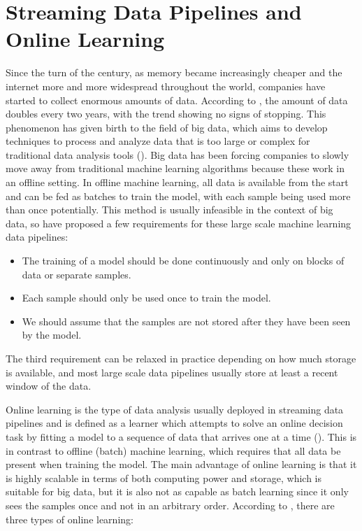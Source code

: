 \documentclass[12pt]{extreport}
\begin{document}
\section{Streaming Data Pipelines and Online Learning}

Since the turn of the century, as memory became increasingly cheaper and the internet more and more widespread throughout the world, companies have started to collect enormous amounts of data. According to \cite{big-data-beginning-future}, the amount of data doubles every two years, with the trend showing no signs of stopping. This phenomenon has given birth to the field of big data, which aims to develop techniques to process and analyze data that is too large or complex for traditional data analysis tools (\cite{wiki:big-data}). Big data has been forcing companies to slowly move away from traditional machine learning algorithms because these work in an offline setting. In offline machine learning, all data is available from the start and can be fed as batches to train the model, with each sample being used more than once potentially. This method is usually infeasible in the context of big data, so \cite{advances-knowledge-discovery} have proposed a few requirements for these large scale machine learning data pipelines:

\begin{itemize}
    \item The training of a model should be done continuously and only on blocks of data or separate samples.
    \item Each sample should only be used once to train the model.
    \item We should assume that the samples are not stored after they have been seen by the model.
\end{itemize}

The third requirement can be relaxed in practice depending on how much storage is available, and most large scale data pipelines usually store at least a recent window of the data.

Online learning is the type of data analysis usually deployed in streaming data pipelines and is defined as a learner which attempts to solve an online decision task by fitting a model to a sequence of data that arrives one at a time (\cite{onlinelearning}). This is in contrast to offline (batch) machine learning, which requires that all data be present when training the model. The main advantage of online learning is that it is highly scalable in terms of both computing power and storage, which is suitable for big data, but it is also not as capable as batch learning since it only sees the samples once and not in an arbitrary order. According to \cite{onlinelearning}, there are three types of online learning:
\end{document}
